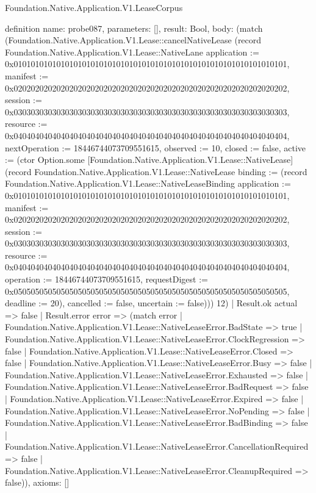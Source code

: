 \begin{lexlean}{Foundation.Native.Application.V1.LeaseCorpus}
\begin{semanticmodule}
definition{
  name: probe087,
  parameters: [],
  result: Bool,
  body: (match (Foundation.Native.Application.V1.Lease::cancelNativeLease (record Foundation.Native.Application.V1.Lease::NativeLane {application := 0x0101010101010101010101010101010101010101010101010101010101010101, manifest := 0x0202020202020202020202020202020202020202020202020202020202020202, session := 0x0303030303030303030303030303030303030303030303030303030303030303, resource := 0x0404040404040404040404040404040404040404040404040404040404040404, nextOperation := 18446744073709551615, observed := 10, closed := false, active := (ctor Option.some [Foundation.Native.Application.V1.Lease::NativeLease] (record Foundation.Native.Application.V1.Lease::NativeLease {binding := (record Foundation.Native.Application.V1.Lease::NativeLeaseBinding {application := 0x0101010101010101010101010101010101010101010101010101010101010101, manifest := 0x0202020202020202020202020202020202020202020202020202020202020202, session := 0x0303030303030303030303030303030303030303030303030303030303030303, resource := 0x0404040404040404040404040404040404040404040404040404040404040404, operation := 18446744073709551615, requestDigest := 0x0505050505050505050505050505050505050505050505050505050505050505, deadline := 20}), cancelled := false, uncertain := false}))}) 12)
    | Result.ok actual => false
    | Result.error error => (match error
      | Foundation.Native.Application.V1.Lease::NativeLeaseError.BadState => true
      | Foundation.Native.Application.V1.Lease::NativeLeaseError.ClockRegression => false
      | Foundation.Native.Application.V1.Lease::NativeLeaseError.Closed => false
      | Foundation.Native.Application.V1.Lease::NativeLeaseError.Busy => false
      | Foundation.Native.Application.V1.Lease::NativeLeaseError.Exhausted => false
      | Foundation.Native.Application.V1.Lease::NativeLeaseError.BadRequest => false
      | Foundation.Native.Application.V1.Lease::NativeLeaseError.Expired => false
      | Foundation.Native.Application.V1.Lease::NativeLeaseError.NoPending => false
      | Foundation.Native.Application.V1.Lease::NativeLeaseError.BadBinding => false
      | Foundation.Native.Application.V1.Lease::NativeLeaseError.CancellationRequired => false
      | Foundation.Native.Application.V1.Lease::NativeLeaseError.CleanupRequired => false)),
  axioms: []
}


\end{semanticmodule}
\end{lexlean}
